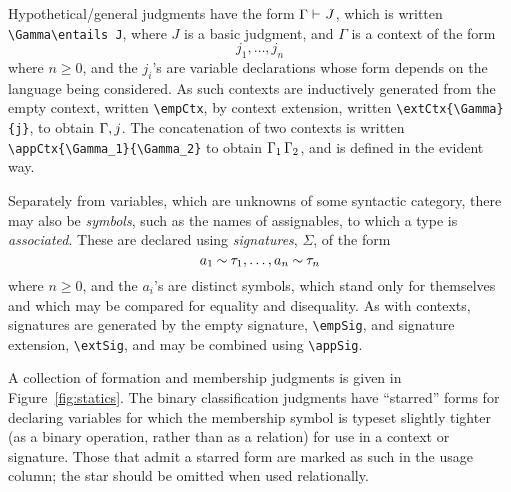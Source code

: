\documentclass[11pt]{article}
\begin{document}
Hypothetical/general judgments have the form $\Gamma\entails J$, which is written \verb|\Gamma\entails J|, where $J$ is a basic judgment, and $\Gamma$ is a context of the form
\[
    j_1,\dots,j_n
\]
where $n\geq 0$, and the $j_i$'s are variable declarations whose form depends on the language being considered.  As such contexts are inductively generated from the empty context, written \verb|\empCtx|, by context extension, written \verb|\extCtx{\Gamma}{j}|, to obtain $\extCtx{\Gamma}{j}$.  The concatenation of two contexts is written \verb|\appCtx{\Gamma_1}{\Gamma_2}| to obtain $\appCtx{\Gamma_1}{\Gamma_2}$, and is defined in the evident way.


Separately from variables, which are unknowns of some syntactic category, there may also be \emph{symbols}, such as the names of assignables, to which a type is \emph{associated}.  These are declared using \emph{signatures}, $\Sigma$, of the form
\[
    \hasTp*{a_1}{\tau_1},\dots,\hasTp*{a_n}{\tau_n}
\]
where $n\geq 0$, and the $a_i$'s are distinct symbols, which stand only for themselves and which may be compared for equality and disequality.  As with contexts, signatures are generated by the empty signature, \verb|\empSig|, and signature extension, \verb|\extSig|, and may be combined using \verb|\appSig|.


\smallskip

A collection of formation and membership judgments is given in Figure~\ref{fig:statics}.  The binary classification judgments have ``starred'' forms for declaring variables for which the membership symbol is typeset slightly tighter (as a binary operation, rather than as a relation) for use in a context or signature.  Those that admit a starred form are marked as such in the usage column; the star should be omitted when used relationally.
\end{document}
